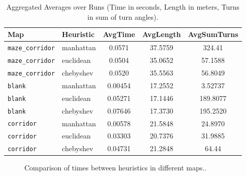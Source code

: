 \documentclass[letterpaper, 10 pt, conference]{ieeeconf}
\begin{document}
\begin{table}[!ht]
\centering
\footnotesize
\caption{Aggregated Averages over Runs (Time in seconds, Length in meters, Turns in sum of turn angles).}
\label{table:aggregated}
\begin{tabular}{|l|l|c|c|c|}
\hline
\textbf{Map} & \textbf{Heuristic} & \textbf{AvgTime} & \textbf{AvgLength} & \textbf{AvgSumTurns} \\
\hline
\texttt{maze\_corridor} & manhattan & 0.0571 & 37.5759 & 324.41 \\
\texttt{maze\_corridor} & euclidean & 0.0504 & 35.0652 & 57.1588 \\
\texttt{maze\_corridor} & chebyshev & 0.0520 & 35.5563 & 56.8049 \\
\hline
\texttt{blank} & manhattan & 0.00454 & 17.2552 & 3.52737 \\
\texttt{blank} & euclidean & 0.05271 & 17.1446 & 189.8077 \\
\texttt{blank} & chebyshev & 0.07646 & 17.3730 & 195.2520 \\
\hline
\texttt{corridor} & manhattan & 0.00578 & 21.5848 & 24.8970 \\
\texttt{corridor} & euclidean & 0.03303 & 20.7376 & 31.9885 \\
\texttt{corridor} & chebyshev & 0.04731 & 21.2848 & 64.44 \\
\hline
\end{tabular}
\end{table}

\begin{figure}[H] %
    \centering
    \caption{Comparison of times between heuristics in different maps..}
    \label{fig:heuristic_comparison}
\end{figure}
\end{document}

